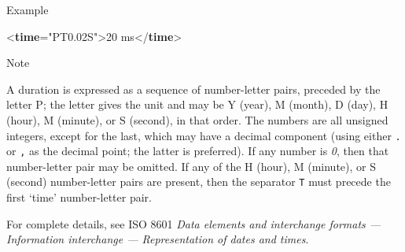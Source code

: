 \begin{reflist}
    \item[{Example}]
  \leavevmode\bgroup{}\exampleFont \begin{shaded}\noindent\mbox{}{<\textbf{time}\hspace*{1em}{dur-iso}="{PT0.02S}">}20 ms{</\textbf{time}>}\end{shaded}\egroup 


    \item[{Note}]
  \par
A duration is expressed as a sequence of number-letter pairs, preceded by the letter P; the letter gives the unit and may be Y (year), M (month), D (day), H (hour), M (minute), or S (second), in that order. The numbers are all unsigned integers, except for the last, which may have a decimal component (using either \texttt{.} or \texttt{,} as the decimal point; the latter is preferred). If any number is \textit{0}, then that number-letter pair may be omitted. If any of the H (hour), M (minute), or S (second) number-letter pairs are present, then the separator \texttt{T} must precede the first ‘time’ number-letter pair.\par
For complete details, see ISO 8601 \textit{Data elements and interchange formats — Information interchange — Representation of dates and times}.
\end{reflist}  
